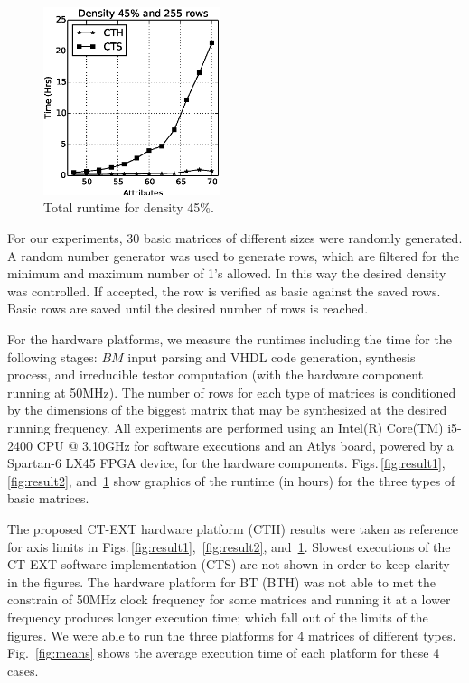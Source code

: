 \documentclass[authoryear,preprint,review,12pt]{elsarticle}
\begin{document}
\begin{figure}[htb]
    \begin{center}
       \includegraphics[height=5.5cm]{med48_density.eps}
    \end{center}
\caption{Total runtime for density 45\%.}
\label{fig:result3}
\end{figure}


For our experiments, 30 basic matrices of different sizes were randomly generated. 
A random number generator was used to generate rows, which are
filtered for the minimum and maximum number of 1's allowed. In this way the desired density was
controlled. If accepted, the row is verified as basic against the saved rows. Basic rows 
are saved until the desired number of rows is reached. 

For the hardware platforms, we measure the runtimes including the time for the following stages: $BM$ input parsing 
and VHDL code generation, synthesis process, and irreducible testor computation (with the hardware 
component running at 50MHz). The number of rows for each type of matrices is conditioned by the dimensions of 
the biggest matrix that may be synthesized at the desired running frequency.
All experiments are performed using an Intel(R) Core(TM) i5-2400 CPU @ 3.10GHz for software executions and 
an Atlys board, powered by a Spartan-6 LX45 FPGA device, for the hardware components.
Figs.\,\ref{fig:result1}, \,\ref{fig:result2}, and \,\ref{fig:result3} show graphics of the runtime (in hours) 
for the three types of basic matrices. 

The proposed CT-EXT hardware platform (CTH) results were taken as reference for axis limits in 
Figs.\,\ref{fig:result1}, \,\ref{fig:result2}, and \,\ref{fig:result3}.
Slowest executions of the CT-EXT software implementation (CTS) are not shown in order to keep clarity in 
the figures. 
The hardware platform for BT (BTH) was not able to met the constrain of 50MHz clock frequency for some 
matrices and running it at a lower frequency produces longer execution time; which fall out of the limits 
of the figures. We were able to run the three platforms for 4 matrices of different types. 
Fig.~\ref{fig:means} shows the average execution time of each platform for these 4 cases.
\end{document}
